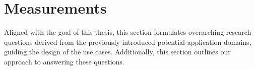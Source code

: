 



\section{Measurements} %
\label{sec:Measurements}
Aligned with the goal of this thesis, this section formulates overarching
    research questions derived from the previously introduced potential
    application domains, guiding the design of the use cases.
Additionally, this section outlines our approach to answering these questions.

